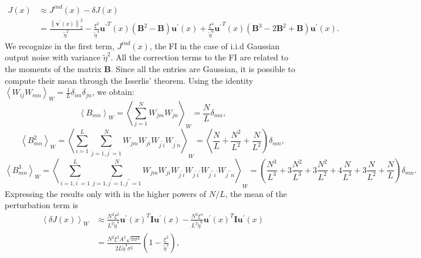 \documentclass[a4paper]{article}%
\begin{document}
\begin{equation}%
\begin{split}
J(x)  &  \approx J^{ind}(x) - \delta J(x)\\
&  = \frac{\left\|  \mathbf{v^{\prime}}(x)\right\|  _{2}^{2}}{\tilde\eta^{2}}
-\frac{\xi^{2}} {\tilde\eta^{4}} \mathbf{u^{\prime}}^{T}(x) \left(
\mathbf{B}^{2} - \mathbf{B} \right)  \mathbf{u^{\prime}}(x) + \frac{\xi^{4}%
}{\tilde\eta^{6}}\mathbf{u^{\prime} }^{T}(x) \left(  \mathbf{B}^{3} -
2\mathbf{B}^{2} + \mathbf{B}\right)  \mathbf{u^{\prime} }(x).
\end{split}
\label{Eq:FIapprox}%
\end{equation}
We recognize in the first term, $J^{ind}(x)$, the FI in the case of i.i.d
Gaussian output noise with variance $\tilde{\eta}^{2}$. All the correction
terms to the FI are related to the moments of the matrix $\mathbf{B}$. Since
all the entries are Gaussian, it is possible to compute their mean through the
Isserlis' theorem. Using the identity $\left\langle W_{ij}W_{mn}\right\rangle
_{W} = \frac{1}{L}\delta_{im} \delta_{jn}$, we obtain:
\begin{equation}
\left\langle B_{mn}\right\rangle _{W} = \left\langle \sum_{j=1}^{N} W_{jm}
W_{jn}\right\rangle _{W} = \frac{N}{L}\delta_{mn},
\end{equation}
\begin{equation}
\left\langle B^{2}_{mn}\right\rangle _{W} = \left\langle \sum_{i=1}^{L}
\sum_{j=1,j^{\prime}=1}^{N} W_{jm} W_{ji}W_{j^{\prime}i}W_{j^{\prime}
n}\right\rangle _{W} = \left\langle \frac{N}{L} + \frac{N^{2}}{L^{2}} +
\frac{N}{L^{2}}\right)  \delta_{mn},
\end{equation}
\begin{equation}
\left\langle B^{3}_{mn}\right\rangle _{W} = \left\langle \sum_{i=1,i^{\prime}
=1}^{L} \sum_{j=1,j^{\prime}=1,j^{\prime\prime}=1}^{N} W_{jm}W_{ji}
W_{j^{\prime}i}W_{j^{\prime}i^{\prime}}W_{j^{\prime\prime}i^{\prime}%
}W_{j^{\prime\prime}n}\right\rangle _{W} =\left(  \frac{N^{3} }{L^{3}} +
3\frac{N^{2}}{L^{3}} + 3\frac{N^{2}}{L^{2}} + 4\frac{N}{L^{3}} + 3\frac
{N}{L^{2}} + \frac{N}{L} \right)  \delta_{mn}.
\end{equation}
Expressing the results only with in the higher powers of $N/L$, the mean of
the perturbation term is
\begin{equation}%
\begin{split}
\left\langle \delta J(x)\right\rangle _{W}  &  \approx\frac{N^{2}\xi^{2}
}{L^{2}\tilde\eta^{4}} \mathbf{u^{\prime}}(x)^{T} \mathbf{I} \mathbf{u^{\prime
}}(x) -\frac{N^{2}\xi^{4}}{L^{2}\tilde\eta^{6}} \mathbf{u^{\prime}}(x)^{T}
\mathbf{I} \mathbf{u^{\prime}}(x)\\
&  = \frac{N^{2}\xi^{2}A^{2} \sqrt{\pi\sigma^{2}}}{2L\tilde\eta^{4} \sigma
^{2}}\left(  1- \frac{\xi^{2}}{\tilde\eta^{2}}\right)  ,
\end{split}
\label{Eq:deltaJ}%
\end{equation}
\end{document}
